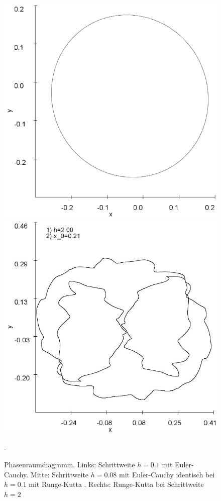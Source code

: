 \documentclass{scrartcl}
\begin{document}
\begin{figure}[!htbp]
\includegraphics[scale=0.28]{duffing-awp1-500k-nach-500k-h0,08-euler}
\includegraphics[scale=0.28]{duffing-awp1-h2-runge-kutta}
\caption{Phasenraumdiagramm. Links: Schrittweite $h=0.1$ mit Euler-Cauchy. Mitte: Schrittweite $h=0.08$ mit Euler-Cauchy identisch bei $h=0.1$ mit Runge-Kutta . Rechts: Runge-Kutta bei Schrittweite $h=2$}. 
\label{fig:duffing-awp1}
\end{figure}
\end{document}
